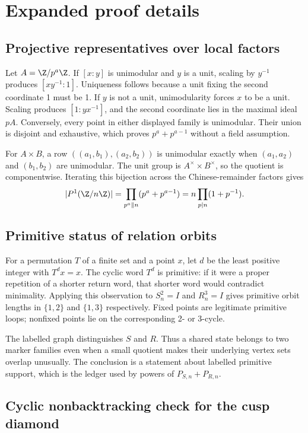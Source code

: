 \section{Expanded proof details}
\label{app:proofs}

\subsection{Projective representatives over local factors}

Let $A=\Z/p^a\Z$.  If $[x:y]$ is unimodular and $y$ is a unit, scaling by
$y^{-1}$ produces $[xy^{-1}:1]$.  Uniqueness follows because a unit fixing the
second coordinate 1 must be 1.  If $y$ is not a unit, unimodularity forces
$x$ to be a unit.  Scaling produces $[1:yx^{-1}]$, and the second coordinate
lies in the maximal ideal $pA$.  Conversely, every point in either displayed
family is unimodular.  Their union is disjoint and exhaustive, which proves
$p^a+p^{a-1}$ without a field assumption.

For $A\times B$, a row $((a_1,b_1),(a_2,b_2))$ is unimodular exactly when
$(a_1,a_2)$ and $(b_1,b_2)$ are unimodular.  The unit group is
$A^\times\times B^\times$, so the quotient is componentwise.  Iterating this
bijection across the Chinese-remainder factors gives
\[
 |P^1(\Z/n\Z)|
 =\prod_{p^a\parallel n}(p^a+p^{a-1})
 =n\prod_{p\mid n}(1+p^{-1}).
\]

\subsection{Primitive status of relation orbits}

For a permutation $T$ of a finite set and a point $x$, let $d$ be the least
positive integer with $T^dx=x$.  The cyclic word $T^d$ is primitive: if it
were a proper repetition of a shorter return word, that shorter word would
contradict minimality.  Applying this observation to $S_n^2=I$ and $R_n^3=I$
gives primitive orbit lengths in $\{1,2\}$ and $\{1,3\}$ respectively.
Fixed points are legitimate primitive loops; nonfixed points lie on the
corresponding 2- or 3-cycle.

The labelled graph distinguishes $S$ and $R$.  Thus a shared state belongs to
two marker families even when a small quotient makes their underlying vertex
sets overlap unusually.  The conclusion is a statement about labelled
primitive support, which is the ledger used by powers of $P_{S,n}+P_{R,n}$.

\subsection{Cyclic nonbacktracking check for the cusp diamond}

